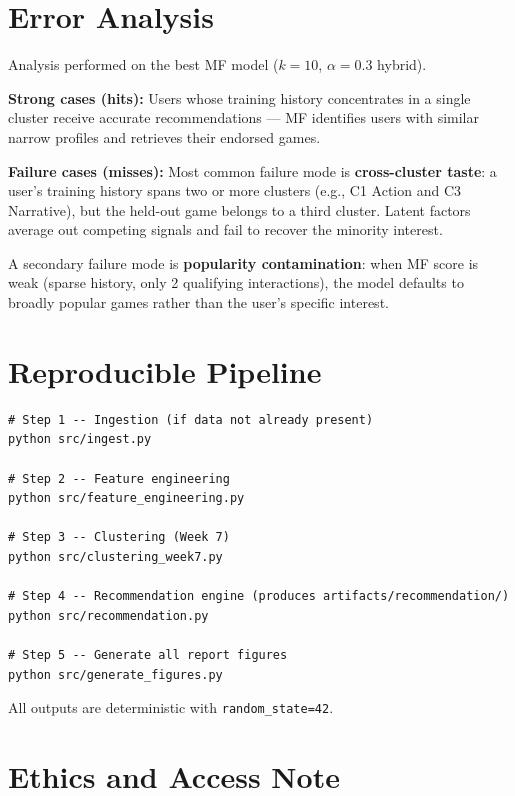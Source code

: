 \documentclass[11pt,a4paper]{article}
\begin{document}
\section{Error Analysis}

Analysis performed on the best MF model ($k=10$, $\alpha=0.3$ hybrid).

\textbf{Strong cases (hits):} Users whose training history concentrates in a single cluster receive accurate recommendations --- MF identifies users with similar narrow profiles and retrieves their endorsed games.

\textbf{Failure cases (misses):} Most common failure mode is \textbf{cross-cluster taste}: a user's training history spans two or more clusters (e.g., C1 Action and C3 Narrative), but the held-out game belongs to a third cluster. Latent factors average out competing signals and fail to recover the minority interest.

A secondary failure mode is \textbf{popularity contamination}: when MF score is weak (sparse history, only 2 qualifying interactions), the model defaults to broadly popular games rather than the user's specific interest.

\section{Reproducible Pipeline}

\begin{verbatim}
# Step 1 -- Ingestion (if data not already present)
python src/ingest.py

# Step 2 -- Feature engineering
python src/feature_engineering.py

# Step 3 -- Clustering (Week 7)
python src/clustering_week7.py

# Step 4 -- Recommendation engine (produces artifacts/recommendation/)
python src/recommendation.py

# Step 5 -- Generate all report figures
python src/generate_figures.py
\end{verbatim}

All outputs are deterministic with \texttt{random\_state=42}.

\section{Ethics and Access Note}
\end{document}
